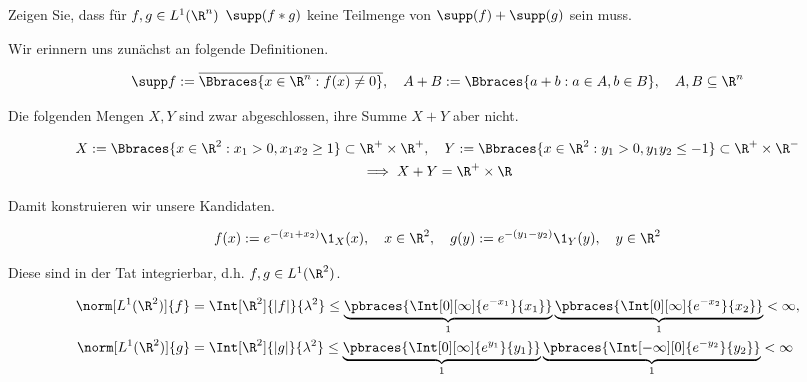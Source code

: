 
\begin{exercise}

Zeigen Sie, dass für $f, g \in L^1(\R^n)$ $\supp(f \ast g)$ keine Teilmenge von $\supp(f) + \supp(g)$ sein muss.

\end{exercise}


\begin{solution}

Wir erinnern uns zunächst an folgende Definitionen.

\begin{align*}
    \supp f
    :=
    \overline
    {
        \Bbraces
        {
            x \in \R^n:
            f(x) \neq 0
        }
    },
    \quad
    A + B
    :=
    \Bbraces
    {
        a + b:
        a \in A,
        b \in B
    },
    \quad
    A, B \subseteq \R^n
\end{align*}

Die folgenden Mengen $X, Y$ sind zwar abgeschlossen, ihre Summe $X + Y$ aber nicht.

\begin{gather*}
    X := \Bbraces{x \in \R^2: x_1 > 0, x_1 x_2 \geq 1} \subset \R^+ \times \R^+,
    \quad
    Y := \Bbraces{x \in \R^2: y_1 > 0, y_1 y_2 \leq -1} \subset \R^+ \times \R^- \\
    \implies
    X + Y = \R^+ \times \R
\end{gather*}

Damit konstruieren wir unsere Kandidaten.

\begin{align*}
    f(x)
    :=
    e^{-(x_1 + x_2)} \1_X(x),
    \quad
    x \in \R^2,
    \quad
    g(y)
    :=
    e^{-(y_1 - y_2)} \1_Y(y),
    \quad
    y \in \R^2
\end{align*}

Diese sind in der Tat integrierbar, d.h. $f, g \in L^1(\R^2)$.

\begin{align*}
    \norm[L^1(\R^2)]{f}
    & =
    \Int[\R^2]{|f|}{\lambda^2}
    \leq
    \underbrace
    {
        \pbraces
        {
            \Int[0][\infty]{e^{-x_1}}{x_1}
        }
    }_1
    \underbrace
    {
        \pbraces
        {
            \Int[0][\infty]{e^{-x_2}}{x_2}
        }
    }_1
    <
    \infty, \\
    \norm[L^1(\R^2)]{g}
    & =
    \Int[\R^2]{|g|}{\lambda^2}
    \leq
    \underbrace
    {
        \pbraces
        {
            \Int[0][\infty]{e^{y_1}}{y_1}
        }
    }_1
    \underbrace
    {
        \pbraces
        {
            \Int[-\infty][0]{e^{-y_2}}{y_2}
        }    
    }_1
    <
    \infty
\end{align*}


\end{solution}
